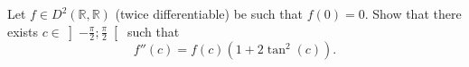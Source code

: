 \begin{problem}
    Let \( f \in D^2\left(\mathbb{R},\mathbb{R}\right) \) (twice differentiable) be such that \( f\left(0\right) = 0 \). Show that there exists \( c \in \left]-\frac{\pi}{2};\frac{\pi}{2}\right[ \) such that
    \[
        f''\left(c\right) = f\left(c\right)\left(1+2\tan^2\left(c\right)\right).
    \]
\end{problem}
